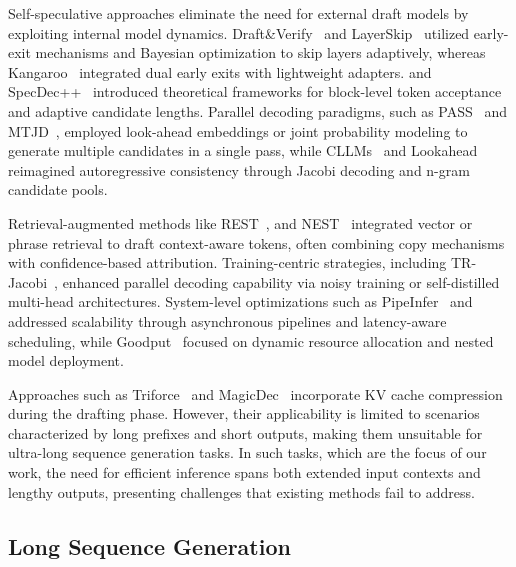 Self-speculative approaches eliminate the need for external draft models by exploiting internal model dynamics. Draft\&Verify~\citep{draft_verify} and LayerSkip~\citep{layerskip} utilized early-exit mechanisms and Bayesian optimization to skip layers adaptively, whereas Kangaroo~\citep{kangaroo} integrated dual early exits with lightweight adapters. \citet{optimal} and SpecDec++~\citep{specdec++} introduced theoretical frameworks for block-level token acceptance and adaptive candidate lengths. Parallel decoding paradigms, such as PASS~\citep{pass} and MTJD~\citep{mtjd}, employed look-ahead embeddings or joint probability modeling to generate multiple candidates in a single pass, while CLLMs~\citep{cllms} and Lookahead~\citep{Lookahead2} reimagined autoregressive consistency through Jacobi decoding and n-gram candidate pools.  

Retrieval-augmented methods like REST~\citep{rest}, and NEST~\citep{nearest} integrated vector or phrase retrieval to draft context-aware tokens, often combining copy mechanisms with confidence-based attribution. Training-centric strategies, including TR-Jacobi~\citep{TR-Jacobi}, enhanced parallel decoding capability via noisy training or self-distilled multi-head architectures. System-level optimizations such as PipeInfer~\citep{PipeInfer} and \citet{faster} addressed scalability through asynchronous pipelines and latency-aware scheduling, while Goodput~\citep{throughput_sd} focused on dynamic resource allocation and nested model deployment. 

Approaches such as Triforce~\citep{triforce} and MagicDec~\citep{magicdec} incorporate KV cache compression during the drafting phase. However, their applicability is limited to scenarios characterized by long prefixes and short outputs, making them unsuitable for ultra-long sequence generation tasks. In such tasks, which are the focus of our work, the need for efficient inference spans both extended input contexts and lengthy outputs, presenting challenges that existing methods fail to address.


\subsection{Long Sequence Generation}

